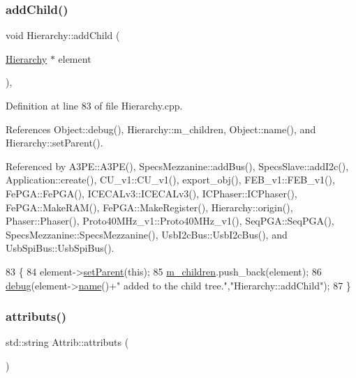 \subsubsection{\texorpdfstring{add\+Child()}{addChild()}}
{\footnotesize\ttfamily void Hierarchy\+::add\+Child (\begin{DoxyParamCaption}\item[{\hyperlink{classHierarchy}{Hierarchy} $\ast$}]{element }\end{DoxyParamCaption})\hspace{0.3cm}{\ttfamily [virtual]}, {\ttfamily [inherited]}}



Definition at line 83 of file Hierarchy.\+cpp.



References Object\+::debug(), Hierarchy\+::m\+\_\+children, Object\+::name(), and Hierarchy\+::set\+Parent().



Referenced by A3\+P\+E\+::\+A3\+P\+E(), Specs\+Mezzanine\+::add\+Bus(), Specs\+Slave\+::add\+I2c(), Application\+::create(), C\+U\+\_\+v1\+::\+C\+U\+\_\+v1(), export\+\_\+obj(), F\+E\+B\+\_\+v1\+::\+F\+E\+B\+\_\+v1(), Fe\+P\+G\+A\+::\+Fe\+P\+G\+A(), I\+C\+E\+C\+A\+Lv3\+::\+I\+C\+E\+C\+A\+Lv3(), I\+C\+Phaser\+::\+I\+C\+Phaser(), Fe\+P\+G\+A\+::\+Make\+R\+A\+M(), Fe\+P\+G\+A\+::\+Make\+Register(), Hierarchy\+::origin(), Phaser\+::\+Phaser(), Proto40\+M\+Hz\+\_\+v1\+::\+Proto40\+M\+Hz\+\_\+v1(), Seq\+P\+G\+A\+::\+Seq\+P\+G\+A(), Specs\+Mezzanine\+::\+Specs\+Mezzanine(), Usb\+I2c\+Bus\+::\+Usb\+I2c\+Bus(), and Usb\+Spi\+Bus\+::\+Usb\+Spi\+Bus().


\begin{DoxyCode}
83                                           \{
84   element->\hyperlink{classHierarchy_a585ad1aeec16077a0e532ab8b4fc557b}{setParent}(\textcolor{keyword}{this});
85   \hyperlink{classHierarchy_a038816763941fd4a930504917f60483b}{m\_children}.push\_back(element);
86   \hyperlink{classObject_aac010553f022165573714b7014a15f0d}{debug}(element->\hyperlink{classObject_a300f4c05dd468c7bb8b3c968868443c1}{name}()+\textcolor{stringliteral}{" added to the child tree."},\textcolor{stringliteral}{"Hierarchy::addChild"});
87 \}
\end{DoxyCode}
\mbox{\label{classAttrib_aee7bbf16b144887f196e1341b24f8a26}} 
\subsubsection{\texorpdfstring{attributs()}{attributs()}}
{\footnotesize\ttfamily std\+::string Attrib\+::attributs (\begin{DoxyParamCaption}{ }\end{DoxyParamCaption})\hspace{0.3cm}{\ttfamily [inherited]}}

